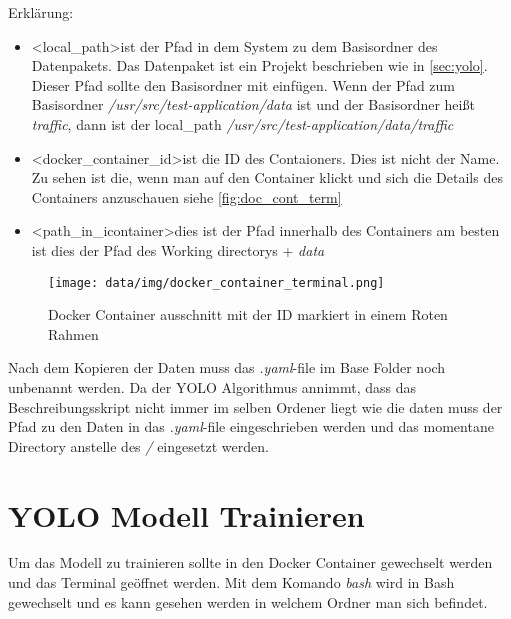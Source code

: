 Erklärung:
\begin{itemize}
    \item \textless local\_path\textgreater ist der Pfad in dem System zu dem Basisordner des Datenpakets. Das Datenpaket ist ein Projekt beschrieben wie in \autoref{sec:yolo}. Dieser Pfad sollte den Basisordner mit einfügen. Wenn der Pfad zum Basisordner \textit{/usr/src/test-application/data} ist und der Basisordner heißt \textit{traffic}, dann ist der local\_path \textit{/usr/src/test-application/data/traffic}
    \item \textless docker\_container\_id\textgreater ist die ID des Contaioners. Dies ist nicht der Name. Zu sehen ist die, wenn man auf den Container klickt und sich die Details des Containers anzuschauen siehe \autoref{fig:doc_cont_term}
    \item \textless path\_in\_icontainer\textgreater dies ist der Pfad innerhalb des Containers am besten ist dies der Pfad des Working directorys + \textit{data}
\end{itemize}

\begin{figure}
    \centering
    \texttt{[image: data/img/docker\_container\_terminal.png]}
    \caption{Docker Container ausschnitt mit der ID markiert in einem Roten Rahmen}
    \label{fig:doc_cont_term}
\end{figure}

Nach dem Kopieren der Daten muss das \textit{.yaml}-file im Base Folder noch unbenannt werden. Da der YOLO Algorithmus annimmt, dass das Beschreibungsskript nicht immer im selben Ordener liegt wie die daten muss der Pfad zu den Daten in das \textit{.yaml}-file eingeschrieben werden und das momentane Directory anstelle des \textit{/} eingesetzt werden.
\section{YOLO Modell Trainieren}
\label{sec:yolo_train}
Um das Modell zu trainieren sollte in den Docker Container gewechselt werden und das Terminal geöffnet werden. Mit dem Komando \textit{bash} wird in Bash gewechselt und es kann gesehen werden in welchem Ordner man sich befindet. 
